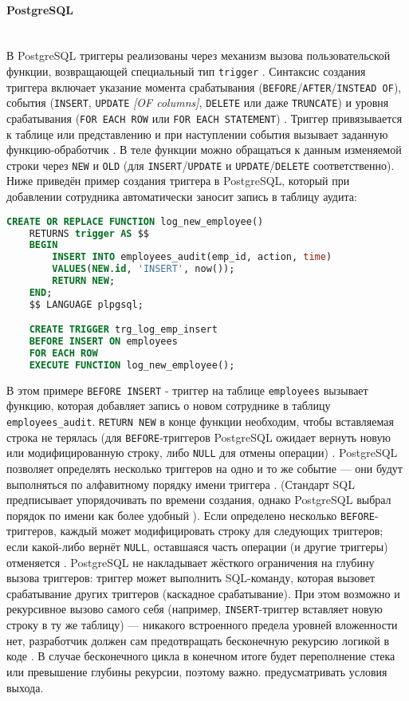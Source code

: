  \paragraph{\textbf{PostgreSQL}} ~\\
 В PostgreSQL триггеры реализованы через механизм вызова пользовательской функции, возвращающей специальный тип \texttt{trigger} \autocite{Postgresqlcom}. Синтаксис создания триггера включает указание момента срабатывания (\texttt{BEFORE}/\texttt{AFTER}/\texttt{INSTEAD OF}), события (\texttt{INSERT}, \texttt{UPDATE} \textit{[OF columns]}, \texttt{DELETE} или даже \texttt{TRUNCATE}) и уровня срабатывания (\texttt{FOR EACH ROW} или \texttt{FOR EACH STATEMENT})  \autocite{Postgresqlcom}. Триггер привязывается к таблице или представлению и при наступлении события вызывает заданную функцию-обработчик \autocite{Postgresqlcom}. В теле функции можно обращаться к данным изменяемой строки через \texttt{NEW} и \texttt{OLD} (для \texttt{INSERT}/\texttt{UPDATE} и \texttt{UPDATE}/\texttt{DELETE} соответственно). Ниже приведён пример создания триггера в PostgreSQL, который при добавлении сотрудника автоматически заносит запись в таблицу аудита:
 \begin{lstlisting}[language=SQL]
    CREATE OR REPLACE FUNCTION log_new_employee()
    RETURNS trigger AS $$
    BEGIN
        INSERT INTO employees_audit(emp_id, action, time)
        VALUES(NEW.id, 'INSERT', now());
        RETURN NEW;
    END;
    $$ LANGUAGE plpgsql;

    CREATE TRIGGER trg_log_emp_insert
    BEFORE INSERT ON employees
    FOR EACH ROW
    EXECUTE FUNCTION log_new_employee();
 \end{lstlisting}

 В этом примере \texttt{BEFORE INSERT} - триггер на таблице \texttt{employees} вызывает функцию, которая добавляет запись о новом сотруднике в таблицу \texttt{employees\_audit}. \texttt{RETURN NEW} в конце функции необходим, чтобы вставляемая строка не терялась (для \texttt{BEFORE}-триггеров PostgreSQL ожидает вернуть новую или модифицированную строку, либо \texttt{NULL} для отмены операции)  \autocite{Postgresqltrig}. PostgreSQL позволяет определять несколько триггеров на одно и то же событие — они будут выполняться по алфавитному порядку имени триггера \autocite{Postgresqlcom}. (Стандарт SQL предписывает упорядочивать по времени создания, однако PostgreSQL выбрал порядок по имени как более удобный \autocite{Postgresqlcom}). Если определено несколько \texttt{BEFORE}-триггеров, каждый может модифицировать строку для следующих триггеров; если какой-либо вернёт \texttt{NULL}, оставшаяся часть операции (и другие триггеры) отменяется \autocite{Postgresqltrig}. PostgreSQL не накладывает жёсткого ограничения на глубину вызова триггеров: триггер может выполнить SQL-команду, которая вызовет срабатывание других триггеров (каскадное срабатывание). При этом возможно и рекурсивное вызово самого себя (например, \texttt{INSERT}-триггер вставляет новую строку в ту же таблицу) — никакого встроенного предела уровней вложенности нет, разработчик должен сам предотвращать бесконечную рекурсию логикой в коде \autocite{Postgresqltrig}. 
 В случае бесконечного цикла в конечном итоге будет переполнение стека или превышение глубины рекурсии, поэтому важно. предусматривать условия выхода.

